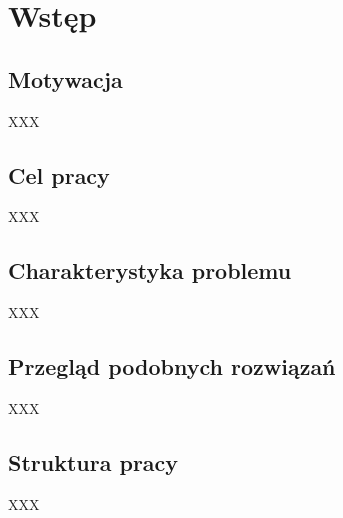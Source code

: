 \clearpage %
\section{Wstęp}

\subsection{Motywacja}

XXX

\cite{docker}

\subsection{Cel pracy}

XXX

\subsection{Charakterystyka problemu}

XXX

\subsection{Przegląd podobnych rozwiązań}

XXX

\subsection{Struktura pracy}

XXX

